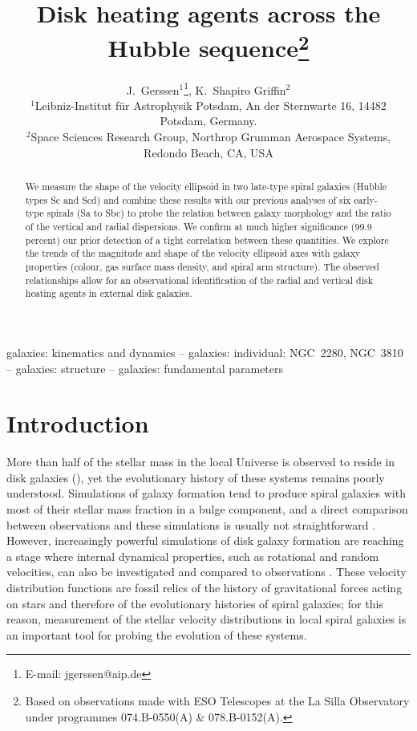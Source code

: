 \documentclass[useAMS,usenatbib]{mn2e}
\title[Disk heating across the Hubble sequence]{Disk heating
    agents across the Hubble sequence\thanks{Based on observations made
      with ESO Telescopes at the La Silla Observatory under programmes
      074.B-0550(A) \& 078.B-0152(A).}}
\author[J.Gerssen \& K. Shapiro Griffin]
{J.~Gerssen$^{1}$\thanks{E-mail: jgerssen@aip.de}, K.~Shapiro Griffin$^{2}$ \\
$^{1}$Leibniz-Institut f\"ur Astrophysik Potsdam, An der Sternwarte 16, 14482 Potsdam, Germany.\\
$^{2}$Space Sciences Research Group, Northrop Grumman Aerospace Systems, Redondo Beach, CA, USA}
\begin{document}

\maketitle

\label{firstpage}

\begin{abstract}
We measure the shape of the velocity ellipsoid in two late-type spiral
galaxies (Hubble types Sc and Scd) and combine these results with our
previous analyses of six early-type spirals (Sa to Sbc) to probe the
relation between galaxy morphology and the ratio of the vertical and
radial dispersions.  We confirm at much higher significance (99.9
percent) our prior detection of a tight correlation between these
quantities.  We explore the trends of the magnitude and shape of the
velocity ellipsoid axes with galaxy properties (colour, gas surface mass
density, and spiral arm structure).  The observed relationships allow
for an observational identification of the radial and vertical disk
heating agents in external disk galaxies.
\end{abstract}

\begin{keywords}
galaxies: kinematics and dynamics -- galaxies: individual: NGC~2280, NGC~3810
-- galaxies: structure -- galaxies: fundamental parameters
\end{keywords}



\section{Introduction}
\label{sec:intro}

More than half of the stellar mass in the local Universe is observed to
reside in disk galaxies (\citealp{Driver2007, Weinzirl2009}), yet the
evolutionary history of these systems remains poorly understood.
Simulations of galaxy formation tend to produce spiral galaxies with
most of their stellar mass fraction in a bulge component, and a direct
comparison between observations and these simulations is usually not
straightforward \citep{Scannapieco2010}.  However, increasingly powerful
simulations of disk galaxy formation are reaching a stage where internal
dynamical properties, such as rotational and random velocities, can also
be investigated and compared to observations \citep{Scannapieco2011}.
These velocity distribution functions are fossil relics of the history
of gravitational forces acting on stars and therefore of the
evolutionary histories of spiral galaxies; for this reason, measurement
of the stellar velocity distributions in local spiral galaxies is an
important tool for probing the evolution of these systems.
\end{document}
